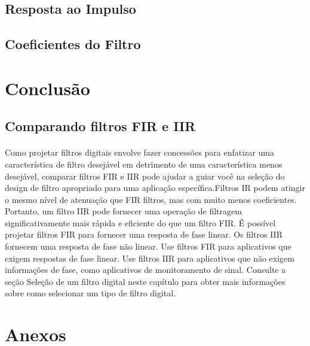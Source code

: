 \documentclass[12pt,fleqn]{article}
\begin{document}
\subsection{Resposta ao Impulso}
\subsection{Coeficientes do Filtro}

\section{Conclusão}
\subsection{Comparando filtros FIR e IIR} 

\paragraph{}Como projetar filtros digitais envolve fazer concessões para enfatizar uma característica de filtro desejável em detrimento de uma característica menos desejável, comparar filtros FIR e IIR pode ajudar a guiar você na seleção do design de filtro apropriado para uma aplicação específica.Filtros IR podem atingir o mesmo nível de atenuação que FIR filtros, mas com muito menos coeficientes. Portanto, um filtro IIR pode fornecer uma operação de filtragem significativamente mais rápida e eficiente do que um filtro FIR. É possível projetar filtros FIR para fornecer uma resposta de fase linear. Os filtros IIR fornecem uma resposta de fase não linear. Use filtros FIR para aplicativos que exigem respostas de fase linear. Use filtros IIR para aplicativos que não exigem informações de fase, como aplicativos de monitoramento de sinal. Consulte a seção Seleção de um filtro digital neste capítulo para obter mais informações sobre como selecionar um tipo de filtro digital.

\newpage
{}
\nocite{*} %




\newpage
\section{Anexos}
\end{document}
